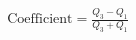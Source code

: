 \documentclass[preview]{standalone}
\begin{document}
\begin{align*}
\text{Coefficient}=\frac{Q_3-Q_1}{Q_3+Q_1}
\end{align*}
\end{document}
